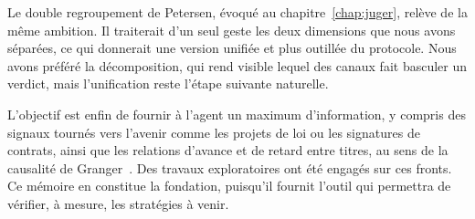 Le double regroupement de Petersen, évoqué au chapitre~\ref{chap:juger},
relève de la même ambition. Il traiterait d'un seul geste les deux dimensions
que nous avons séparées, ce qui donnerait une version unifiée et plus outillée
du protocole. Nous avons préféré la décomposition, qui rend visible lequel des
canaux fait basculer un verdict, mais l'unification reste l'étape suivante
naturelle.

L'objectif est enfin de fournir à l'agent un maximum d'information, y compris
des signaux tournés vers l'avenir comme les projets de loi ou les signatures
de contrats, ainsi que les relations d'avance et de retard entre titres, au
sens de la causalité de Granger~\cite{granger1969}. Des travaux exploratoires
ont été engagés sur ces fronts. Ce mémoire en constitue la fondation, puisqu'il
fournit l'outil qui permettra de vérifier, à mesure, les stratégies à venir.
